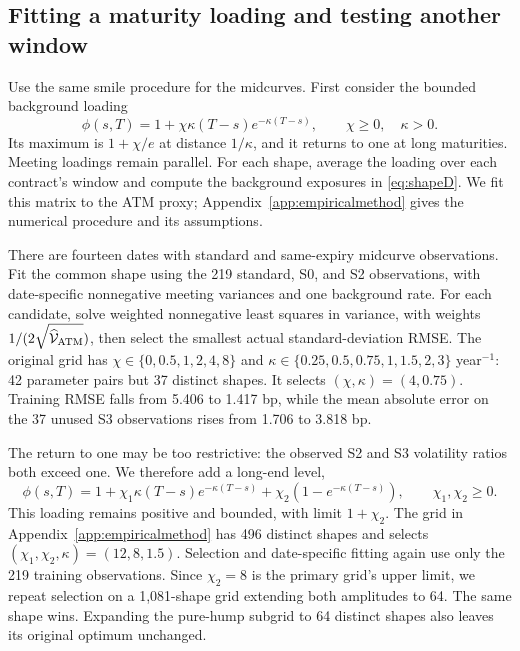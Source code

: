 \subsection{Fitting a maturity loading and testing another window}\label{sec:humpfit}
Use the same smile procedure for the midcurves. First consider the bounded background loading
\begin{equation}\label{eq:humpshape}
\phi(s,T)=1+\chi\kappa(T-s)e^{-\kappa(T-s)},\qquad \chi\geq0,\quad\kappa>0.
\end{equation}
Its maximum is $1+\chi/e$ at distance $1/\kappa$, and it returns to one at long maturities. Meeting loadings remain parallel. For each shape, average the loading over each contract's window and compute the background exposures in \eqref{eq:shapeD}. We fit this matrix to the ATM proxy; Appendix~\ref{app:empiricalmethod} gives the numerical procedure and its assumptions.

There are fourteen dates with standard and same-expiry midcurve observations. Fit the common shape using the 219 standard, S0, and S2 observations, with date-specific nonnegative meeting variances and one background rate. For each candidate, solve weighted nonnegative least squares in variance, with weights $1/(2\sqrt{\widehat{\mathcal V}_{\rm ATM}})$, then select the smallest actual standard-deviation RMSE. The original grid has $\chi\in\{0,0.5,1,2,4,8\}$ and $\kappa\in\{0.25,0.5,0.75,1,1.5,2,3\}$ year$^{-1}$: 42 parameter pairs but 37 distinct shapes. It selects $(\chi,\kappa)=(4,0.75)$. Training RMSE falls from 5.406 to 1.417 bp, while the mean absolute error on the 37 unused S3 observations rises from 1.706 to 3.818 bp.

The return to one may be too restrictive: the observed S2 and S3 volatility ratios both exceed one. We therefore add a long-end level,
\begin{equation}\label{eq:levelshape}
\phi(s,T)=1+\chi_1\kappa(T-s)e^{-\kappa(T-s)}
               +\chi_2(1-e^{-\kappa(T-s)}),\qquad \chi_1,\chi_2\geq0.
\end{equation}
This loading remains positive and bounded, with limit $1+\chi_2$. The grid in Appendix~\ref{app:empiricalmethod} has 496 distinct shapes and selects $(\chi_1,\chi_2,\kappa)=(12,8,1.5)$. Selection and date-specific fitting again use only the 219 training observations. Since $\chi_2=8$ is the primary grid's upper limit, we repeat selection on a 1,081-shape grid extending both amplitudes to 64. The same shape wins. Expanding the pure-hump subgrid to 64 distinct shapes also leaves its original optimum unchanged.

